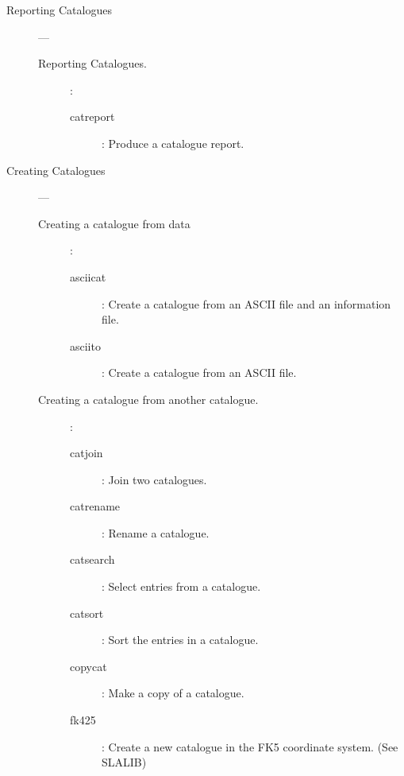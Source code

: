 \begin{description}

\item [Reporting Catalogues] ---

\begin{description}

\item [Reporting Catalogues.]:

\begin {description}

\item [catreport]:
 Produce a catalogue report.

\end{description}
\end{description}

\item [Creating Catalogues] ---

\begin{description}

\item [Creating a catalogue from data]:

\begin {description}

\item [asciicat]:
 Create a catalogue from an ASCII file and an information file.

\item [asciito]:
 Create a catalogue from an ASCII file.

\end{description}

\item [Creating a catalogue from another catalogue.] :

\begin{description}

\item [catjoin]:
 Join two catalogues.

\item [catrename]:
 Rename a catalogue.

\item [catsearch]:
 Select entries from a catalogue.

\item [catsort]:
 Sort the entries in a catalogue.

\item [copycat]:
 Make a copy of a catalogue.

\item [fk425]:
 Create a new catalogue in the FK5 coordinate system. (See SLALIB)


\end{description}
\end{description}
\end{description}
